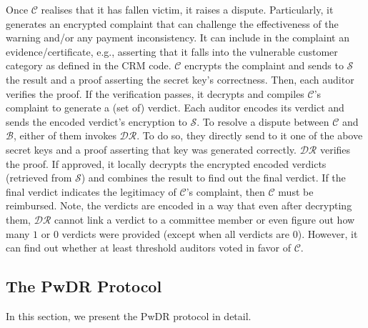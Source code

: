 

Once $\mathcal{C}$ realises that it has fallen victim, it  raises a dispute. Particularly, it  generates  an encrypted complaint that can  challenge the effectiveness of the warning and/or any payment inconsistency. It can   include in the complaint an  evidence/certificate, e.g., asserting that it falls into  the vulnerable customer category as defined in the CRM code. $\mathcal{C}$ encrypts the complaint and  sends to $\mathcal{S}$ the result and a proof asserting the secret key's correctness.  Then, each auditor verifies the proof. If the verification passes, it decrypts and compiles $\mathcal{C}$'s complaint to generate a (set of) verdict. Each  auditor encodes its verdict and sends the   encoded verdict's encryption to $\mathcal{S}$. To resolve a dispute between $\mathcal{C}$ and $\mathcal{B}$, either of them   invokes $\mathcal{DR}$. To do so, they  directly send to it one of the above secret keys and a proof asserting that key was generated correctly.   $\mathcal{DR}$ verifies the proof. If  approved, it locally decrypts the encrypted encoded verdicts (retrieved from $\mathcal{S}$) and  combines the result to find out the final verdict.  If the final verdict indicates the legitimacy of  $\mathcal{C}$'s complaint, then $\mathcal{C}$ must be reimbursed.   Note, the verdicts are encoded in  a way that even after decrypting them, $\mathcal{DR}$ cannot link a verdict to a committee member or even figure out how many $1$ or $0$ verdicts were provided  (except when all verdicts are $0$). However, it can find out whether at least threshold auditors voted  in favor of $\mathcal{C}$. %










\subsection{The PwDR Protocol}\label{sec::PwDR-auditorprotocol}
\vspace{-1mm}
In this section, we present the PwDR protocol in detail. 


